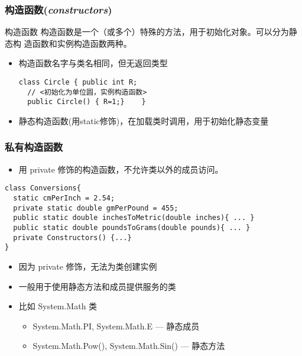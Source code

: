 \begin{frame}[fragile]
\frametitle{构造函数(\textit{constructors})}
\begin{block}{构造函数}
  \CJKindent 构造函数是一个（或多个）特殊的方法，用于初始化对象。可以分为静态构
  造函数和实例构造函数两种。
\end{block}
\medskip
\begin{itemize}
\item 构造函数名字与类名相同，但无返回类型
\begin{lstlisting}[escapeinside=<>]
class Circle { public int R;
  // <初始化为单位圆，实例构造函数>
  public Circle() { R=1;}    }
\end{lstlisting}
\medskip
\item 静态构造函数(用static修饰)，在加载类时调用，用于初始化静态变量
\end{itemize}
\end{frame}

\begin{frame}[fragile]
\frametitle{私有构造函数}
\begin{itemize}
\item 用 private 修饰的构造函数，不允许类以外的成员访问。
\end{itemize}
\begin{lstlisting}
class Conversions{
  static cmPerInch = 2.54;
  private static double gmPerPound = 455;
  public static double inchesToMetric(double inches){ ... }
  public static double poundsToGrams(double pounds){ ... }
  private Constructors() {...}
}
\end{lstlisting}
\begin{itemize}
\item 因为 private 修饰，无法为类创建实例
\item 一般用于使用静态方法和成员提供服务的类
\item 比如 System.Math 类
\begin{itemize}
\item System.Math.PI, System.Math.E   --- 静态成员
\item System.Math.Pow(), System.Math.Sin() --- 静态方法
\end{itemize}
\end{itemize}

\end{frame}


